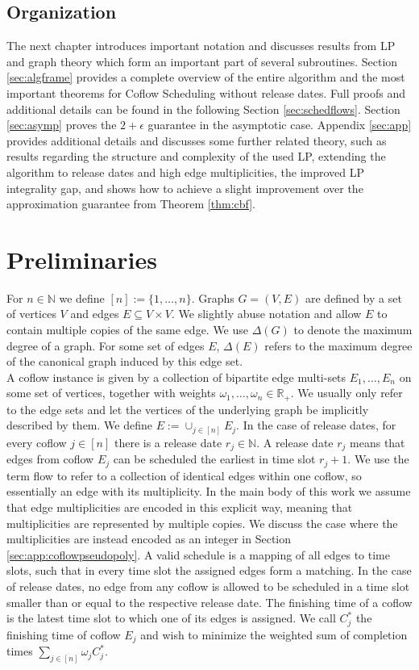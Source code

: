 \documentclass[11pt]{article}
\begin{document}
\subsection{Organization}
The next chapter introduces important notation and discusses results from LP and graph theory which form an important part of several subroutines. Section \ref{sec:algframe} provides a complete overview of the entire algorithm and the most important theorems for Coflow Scheduling without release dates. Full proofs and additional details can be found in the following Section \ref{sec:schedflows}. Section \ref{sec:asymp} proves the $2+\epsilon$ guarantee in the asymptotic case. Appendix \ref{sec:app} provides additional details and discusses some further related theory, such as results regarding the structure and complexity of the used LP, extending the algorithm to release dates and high edge multiplicities, the improved LP integrality gap, and shows how to achieve a slight improvement over the approximation guarantee from Theorem \ref{thm:cbf}.

\section{Preliminaries}

For $n \in \mathbb{N}$ we define $[n] := \{1,\dotsc,n\}$. Graphs $G = (V,E)$ are defined by a set of vertices $V$ and edges $E \subseteq V \times V$. We slightly abuse notation and allow $E$ to contain multiple copies of the same edge. We use $\Delta(G)$ to denote the maximum degree of a graph. For some set of edges $E$, $\Delta(E)$ refers to the maximum degree of the canonical graph induced by this edge set. \\

A coflow instance is given by a collection of bipartite edge multi-sets $E_1,\dotsc,E_n$ on some set of vertices, together with weights $\omega_1,\dotsc,\omega_n \in \mathbb{R}_+$. We usually only refer to the edge sets and let the vertices of the underlying graph be implicitly described by them. We define $E := \cup_{j \in [n]}E_j$. In the case of release dates, for every coflow $j \in [n]$ there is a release date $r_j \in \mathbb{N}$. A release date $r_j$ means that edges from coflow $E_j$ can be scheduled the earliest in time slot $r_j+1$. We use the term flow to refer to a collection of identical edges within one coflow, so essentially an edge with its multiplicity. In the main body of this work we assume that edge multiplicities are encoded in this explicit way, meaning that multiplicities are represented by multiple copies. We discuss the case where the multiplicities are instead encoded as an integer in Section \ref{sec:app:coflowpseudopoly}. A valid schedule is a mapping of all edges to time slots, such that in every time slot the assigned edges form a matching. In the case of release dates, no edge from any coflow is allowed to be scheduled in a time slot smaller than or equal to the respective release date. The finishing time of a coflow is the latest time slot to which one of its edges is assigned. We call $C^*_j$ the finishing time of coflow $E_j$ and wish to minimize the weighted sum of completion times $\sum_{j \in [n]}\omega_jC^*_{j}$.\\
\end{document}
